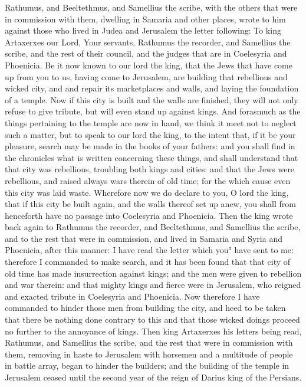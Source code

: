{ Rathumus, and Beeltethmus, and
 Samellius the scribe, with the others that were in commission with them, dwelling in Samaria and other places, wrote to him against those who lived in Judea and Jerusalem the letter following:
To king Artaxerxes our Lord, Your servants, Rathumus the recorder, and Samellius the scribe, and the rest of their council, and the judges that are in Coelesyria and Phoenicia.
Be it now known to our lord the king, that the Jews that have come up from you to us, having come to Jerusalem, are building that rebellious and wicked city, and and repair its marketplaces and walls, and laying the foundation of a temple.
Now if this city is built and the walls
{} are finished, they will not only refuse to give tribute, but will even stand up against kings.
And forasmuch as the things pertaining to the temple are now in hand, we think it meet not to neglect such a matter,
but to speak to our lord the king, to the intent that, if it be your pleasure, search may be made in the books of your fathers:
and you shall find in the chronicles what is written concerning these things, and shall understand that that city was rebellious, troubling both kings and cities:
and that the Jews were rebellious, and raised always wars therein of old time; for the which cause even this city was laid waste.
Wherefore now we do declare to you, O lord the king, that if this city be built again, and the walls thereof set up anew, you shall from henceforth have no passage into Coelesyria and Phoenicia.
Then the king wrote back again to Rathumus the recorder, and Beeltethmus, and Samellius the scribe, and to the rest that were in commission, and lived in Samaria and Syria and Phoenicia, after this manner:
I have read the letter which you° have sent to me: therefore I commanded to make search, and it has been found that that city of old time has made insurrection against kings;
and the men were given to rebellion and war therein: and that mighty kings and fierce were in Jerusalem, who reigned and exacted tribute in Coelesyria and Phoenicia.
Now therefore I have commanded to hinder those men from building the city, and heed to be taken that there be nothing done contrary to this
{}
and that those wicked doings proceed no further to the annoyance of kings.
Then king Artaxerxes his letters being read, Rathumus, and Samellius the scribe, and the rest that were in commission with them, removing in haste to Jerusalem with horsemen and a multitude of people in battle array, began to hinder the builders; and the building of the temple in Jerusalem ceased until the second year of the reign of Darius king of the Persians.

}
